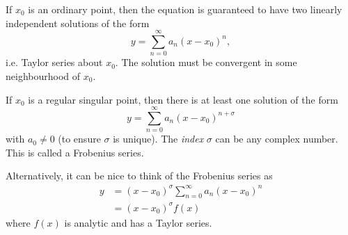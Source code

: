 \documentclass[a4paper]{article}
\theoremstyle{definition}
\begin{document}
If $x_0$ is an ordinary point, then the equation is guaranteed to have two linearly independent solutions of the form 
\[
y = \sum_{n = 0}^\infty a_n(x - x_0)^n,
\]
i.e. Taylor series about $x_0$. The solution must be convergent in some neighbourhood of $x_0$.

If $x_0$ is a regular singular point, then there is at least one solution of the form 
\[
y = \sum_{n = 0}^\infty a_n(x - x_0)^{n + \sigma}
\]
with $a_0 \not= 0$ (to ensure $\sigma$ is unique). The \emph{index} $\sigma$ can be any complex number. This is called a Frobenius series.

Alternatively, it can be nice to think of the Frobenius series as 
\begin{align*}
  y &= (x - x_0)^\sigma \sum_{n = 0}^\infty a_n (x - x_0)^n\\
  &= (x-x_0)^\sigma f(x)
\end{align*}
where $f(x)$ is analytic and has a Taylor series.
\end{document}
